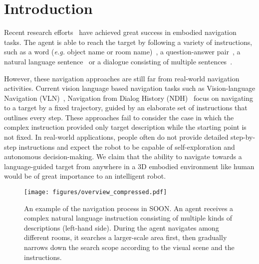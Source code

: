 \documentclass[final]{cvpr}
\begin{document}
\section{Introduction}
Recent research efforts~\cite{wu2018building, gupta2020cognitive, fried2018speaker, wang2018reinforced, mezghani2020learning, thomason2019vision, majumdar2020improving} have achieved  great success in embodied navigation tasks. 
The agent is able to reach the target by following a variety of instructions, such as a word (\emph{e.g.} object name or room name)~\cite{wu2018building, savva2017minos}, a question-answer pair~\cite{das2018embodied, gordon2018iqa}, a natural language sentence~\cite{anderson2018vision} or a dialogue consisting of multiple sentences~\cite{thomason2019vision,ZZLJCL20}. 

However, these navigation approaches are still far from real-world navigation activities. Current vision language based navigation tasks such as Vision-language Navigation (VLN)~\cite{anderson2018vision}, Navigation from Dialog History (NDH)~\cite{thomason2019vision}  focus on navigating to a target by a fixed trajectory, guided by an elaborate set of instructions that outlines every step. These approaches fail to consider the case in which the complex instruction provided only target description while the starting point is not fixed. In real-world applications, people often do not provide detailed step-by-step instructions and expect the robot to be capable of self-exploration and autonomous decision-making. 
We claim that the ability to navigate towards a language-guided target from anywhere in a 3D embodied environment like human would be of great importance to an intelligent robot. 

\begin{figure*}[t]
	\centering
\texttt{[image: figures/overview\_compressed.pdf]}
	\caption{
	An example of the navigation process in SOON. An agent receives a complex natural language instruction consisting of multiple kinds of descriptions (left-hand side). During the agent navigates among different rooms, it searches a larger-scale area first, then gradually narrows down the search scope according to the visual scene and the instructions. }
	\label{fig:overview}
	\vspace{-8pt}
\end{figure*}
\end{document}
